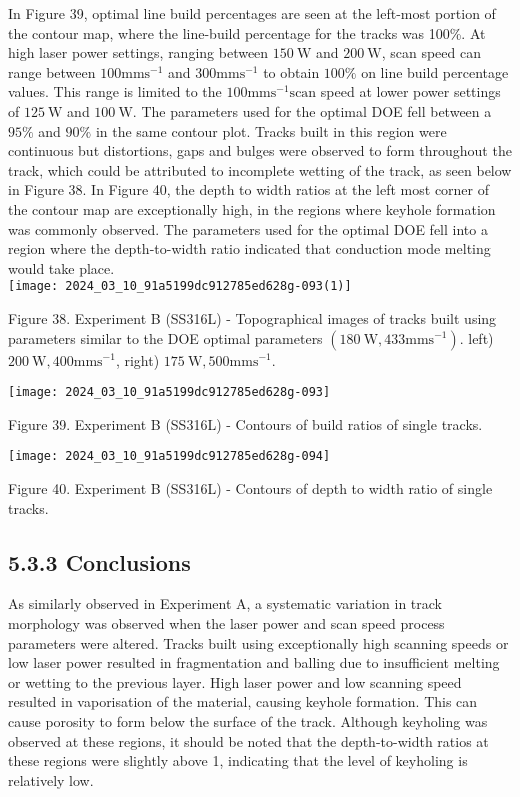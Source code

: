 \documentclass[10pt]{article}
\begin{document}
In Figure 39, optimal line build percentages are seen at the left-most portion of the contour map, where the line-build percentage for the tracks was 100\%. At high laser power settings, ranging between $150 \mathrm{~W}$ and $200 \mathrm{~W}$, scan speed can range between $100 \mathrm{mms}^{-1}$ and $300 \mathrm{mms}^{-1}$ to obtain $100 \%$ on line build percentage values. This range is limited to the $100 \mathrm{mms}^{-1} \mathrm{scan}$ speed at lower power settings of $125 \mathrm{~W}$ and $100 \mathrm{~W}$. The parameters used for the optimal DOE fell between a $95 \%$ and $90 \%$ in the same contour plot. Tracks built in this region were continuous but distortions, gaps and bulges were observed to form throughout the track, which could be attributed to incomplete wetting of the track, as seen below in Figure 38. In Figure 40, the depth to width ratios at the left most corner of the contour map are exceptionally high, in the regions where keyhole formation was commonly observed. The parameters used for the optimal DOE fell into a region where the depth-to-width ratio indicated that conduction mode melting would take place.\\
\texttt{[image: 2024\_03\_10\_91a5199dc912785ed628g-093(1)]}

Figure 38. Experiment B (SS316L) - Topographical images of tracks built using parameters similar to the DOE optimal parameters $\left(180 \mathrm{~W}, 433 \mathrm{mms}^{-1}\right)$. left) $200 \mathrm{~W}, 400 \mathrm{mms}^{-1}$, right) $175 \mathrm{~W}, 500 \mathrm{mms}^{-1}$.

\begin{center}
\texttt{[image: 2024\_03\_10\_91a5199dc912785ed628g-093]}
\end{center}

Figure 39. Experiment B (SS316L) - Contours of build ratios of single tracks.

\begin{center}
\texttt{[image: 2024\_03\_10\_91a5199dc912785ed628g-094]}
\end{center}

Figure 40. Experiment B (SS316L) - Contours of depth to width ratio of single tracks.

\subsection*{5.3.3 Conclusions}
As similarly observed in Experiment A, a systematic variation in track morphology was observed when the laser power and scan speed process parameters were altered. Tracks built using exceptionally high scanning speeds or low laser power resulted in fragmentation and balling due to insufficient melting or wetting to the previous layer. High laser power and low scanning speed resulted in vaporisation of the material, causing keyhole formation. This can cause porosity to form below the surface of the track. Although keyholing was observed at these regions, it should be noted that the depth-to-width ratios at these regions were slightly above 1, indicating that the level of keyholing is relatively low.
\end{document}
